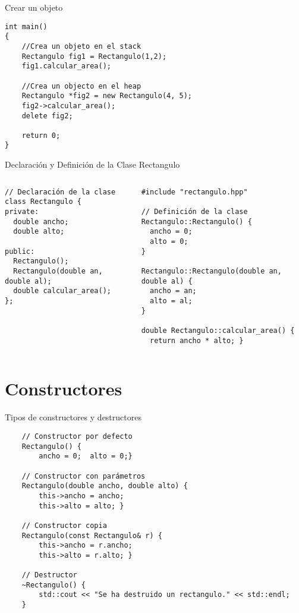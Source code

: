 \documentclass{beamer}
\begin{document}
\begin{frame}[fragile]{Crear un objeto}
    \begin{verbatim}
int main()
{
    //Crea un objeto en el stack
    Rectangulo fig1 = Rectangulo(1,2);
    fig1.calcular_area();

    //Crea un objecto en el heap
    Rectangulo *fig2 = new Rectangulo(4, 5);
    fig2->calcular_area();
    delete fig2;
    
    return 0;
}
    \end{verbatim}
\end{frame}



\begin{frame}[fragile]{Declaración y Definición de la Clase Rectangulo}
  \begin{columns}
    \begin{column}{0.5\textwidth}
      \begin{verbatim}
// Declaración de la clase
class Rectangulo {
private:
  double ancho;
  double alto;

public:
  Rectangulo();
  Rectangulo(double an, double al);
  double calcular_area();
};
      \end{verbatim}
    \end{column}
    \begin{column}{0.5\textwidth}
      \begin{verbatim}
#include "rectangulo.hpp"

// Definición de la clase
Rectangulo::Rectangulo() {
  ancho = 0;
  alto = 0;
}

Rectangulo::Rectangulo(double an, double al) {
  ancho = an;
  alto = al;
}

double Rectangulo::calcular_area() {
  return ancho * alto; }
      \end{verbatim}
    \end{column}
  \end{columns}
\end{frame}

\section{Constructores}

\begin{frame}[fragile]{Tipos de constructores y destructores}

\begin{verbatim}
    // Constructor por defecto
    Rectangulo() {
        ancho = 0;  alto = 0;}

    // Constructor con parámetros
    Rectangulo(double ancho, double alto) {
        this->ancho = ancho; 
        this->alto = alto; }
        
    // Constructor copia
    Rectangulo(const Rectangulo& r) {
        this->ancho = r.ancho; 
        this->alto = r.alto; }
        
    // Destructor
    ~Rectangulo() {
        std::cout << "Se ha destruido un rectangulo." << std::endl;
    }    
\end{verbatim}
\end{frame}
\end{document}
